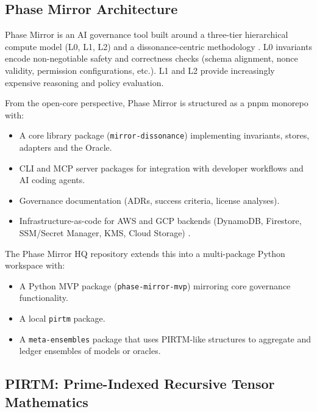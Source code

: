 \documentclass[11pt]{article}
\begin{document}
\subsection{Phase Mirror Architecture}

Phase Mirror is an AI governance tool built around a three-tier hierarchical compute model (L0, L1, L2) and a dissonance-centric methodology \cite{pm-phases0-3,pm-mvp-analysis,pm-gcp-guide}. L0 invariants encode non-negotiable safety and correctness checks (schema alignment, nonce validity, permission configurations, etc.). L1 and L2 provide increasingly expensive reasoning and policy evaluation.

From the open-core perspective, Phase Mirror is structured as a pnpm monorepo with:
\begin{itemize}
  \item A core library package (\texttt{mirror-dissonance}) implementing invariants, stores, adapters and the Oracle.
  \item CLI and MCP server packages for integration with developer workflows and AI coding agents.
  \item Governance documentation (ADRs, success criteria, license analyses).
  \item Infrastructure-as-code for AWS and GCP backends (DynamoDB, Firestore, SSM/Secret Manager, KMS, Cloud Storage) \cite{pm-gcp-guide,pm-open-core-dev}.
\end{itemize}

The Phase Mirror HQ repository extends this into a multi-package Python workspace with:
\begin{itemize}
  \item A Python MVP package (\texttt{phase-mirror-mvp}) mirroring core governance functionality.
  \item A local \texttt{pirtm} package.
  \item A \texttt{meta-ensembles} package that uses PIRTM-like structures to aggregate and ledger ensembles of models or oracles.
\end{itemize}

\subsection{PIRTM: Prime-Indexed Recursive Tensor Mathematics}
\end{document}
